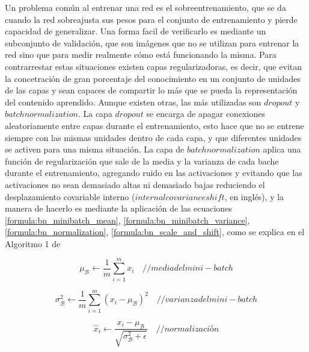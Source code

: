  
 
 Un problema común al entrenar una red es el sobreentrenamiento, que se da cuando la red sobreajusta sus pesos para el conjunto de entrenamiento y pierde capacidad de generalizar. Una forma facil de verificarlo es mediante un subconjunto de validación, que son imágenes que no se utilizan para entrenar la red sino que para medir realmente cómo está funcionando la misma. Para contrarrestar estas situaciones existen capas regularizadoras, es decir, que evitan la concetración de gran porcentaje del conocimiento en un conjunto de unidades de las capas y sean capaces de compartir lo más que se pueda la representación del contenido aprendido. Aunque existen otras, las más utilizadas son \(dropout\) y \(batch normalization\). La capa \(dropout\) se encarga de apagar conexiones aleatoriamente entre capas durante el entrenamiento, esto hace que no se entrene siempre con las mismas unidades dentro de cada capa, y que diferentes unidades se activen para una misma situación. La capa de \(batch normalization\) aplica una función de regularización que sale de la media y la varianza de cada bache durante el entrenamiento, agregando ruido en las activaciones y evitando que las activaciones no sean demasiado altas ni demasiado bajas reduciendo el desplazamiento covariable interno (\(internal covariance shift\), en inglés), y la manera de hacerlo es mediante la aplicación de las ecuaciones \ref{formula:bn_minibatch_mean}, \ref{formula:bn_minibatch_variance}, \ref{formula:bn_normalization}, \ref{formula:bn_scale_and_shift}, como se explica en el Algoritmo 1 de \cite{BatchNorm}
 
 \begin{equation}\label{formula:bn_minibatch_mean}
 \mu_{\mathcal{B}} \leftarrow \frac{1}{m} \sum_{i=1}^{m} x_{i}
\quad { // media del mini-batch}
 \end{equation}
 
 \begin{equation}\label{formula:bn_minibatch_variance}
 \sigma_{\mathcal{B}}^{2} \leftarrow \frac{1}{m} \sum_{i=1}^{m}\left(x_{i}-\mu_{\mathcal{B}}\right)^{2}
\quad { // varianza del mini-batch}
 \end{equation}
 
 \begin{equation}\label{formula:bn_normalization}
 \widehat{x}_{i} \leftarrow \frac{x_{i}-\mu_{\mathcal{B}}}{\sqrt{\sigma_{\mathcal{B}}^{2}+\epsilon}}
\quad { // normalización}
 \end{equation}
 
